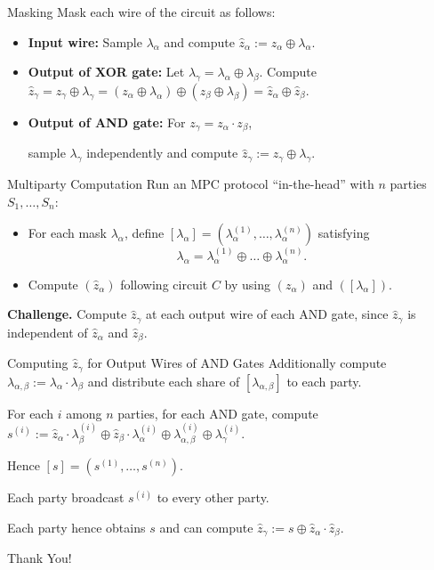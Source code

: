 \documentclass{beamer}
\begin{document}
	\begin{frame}{Masking}
		Mask each wire of the circuit as follows:
		\begin{itemize}
			\item \textbf{Input wire:} Sample $\lambda_\alpha$ and compute $\hat{z}_\alpha := z_\alpha \oplus \lambda_\alpha$.
			\item \textbf{Output of XOR gate:} Let $\lambda_\gamma = \lambda_\alpha \oplus \lambda_\beta$. Compute $\hat{z}_\gamma = z_\gamma \oplus \lambda_\gamma = (z_\alpha \oplus \lambda_\alpha) \oplus (z_\beta \oplus \lambda_\beta) =\hat{z}_\alpha \oplus \hat{z}_\beta$.
			\item \textbf{Output of AND gate:} For $z_\gamma = z_\alpha \cdot z_\beta$, 
			
			sample $\lambda_\gamma$ independently and compute $\hat{z}_\gamma := z_\gamma \oplus \lambda_\gamma$.
		\end{itemize}
	\end{frame}

	\begin{frame}{Multiparty Computation}
		Run an MPC protocol ``in-the-head'' with $n$ parties $S_1, \dots, S_n$:
		\begin{itemize}
			\item For each mask $\lambda_\alpha$, define $[\lambda_\alpha] = (\lambda_\alpha^{(1)}, \dots, \lambda_\alpha^{(n)})$ satisfying 
			\begin{equation*}
				\lambda_\alpha = \lambda_\alpha^{(1)} \oplus \dots\oplus \lambda_\alpha^{(n)}.
			\end{equation*}
			\item Compute $\left(\hat{z}_\alpha\right)$ following circuit $C$ by using $\left(z_\alpha\right)$ and $\left([\lambda_\alpha]\right)$.
		\end{itemize}
		\textbf{Challenge.} Compute $\hat{z}_\gamma$ at each output wire of each AND gate, since $\hat{z}_\gamma$ is independent of $\hat{z}_\alpha$ and $\hat{z}_\beta$.
	\end{frame}

	\begin{frame}{Computing $\hat{z}_\gamma$ for Output Wires of AND Gates}
		Additionally compute $\lambda_{\alpha,\beta} := \lambda_\alpha \cdot \lambda_\beta$ and distribute each share of $[\lambda_{\alpha,\beta}]$ to each party.
		
		For each $i$ among $n$ parties, for each AND gate, compute $s^{(i)} := \hat{z}_\alpha \cdot\lambda_\beta^{(i)}  \oplus \hat{z}_\beta\cdot\lambda_\alpha^{(i)}  \oplus \lambda_{\alpha,\beta}^{(i)}  \oplus \lambda_\gamma^{(i)} $.
		
		Hence $[s] = (s^{(1)}, \dots, s^{(n)})$. 
		
		Each party broadcast $s^{(i)}$ to every other party. 
		
		Each party hence obtains $s$ and can compute $\hat{z}_\gamma := s \oplus \hat{z}_\alpha \cdot \hat{z}_\beta$.
	\end{frame}
	
	\begin{frame}{}
		\begin{center}
			{\fontsize{20}{20}\selectfont Thank You!}
		\end{center}
	\end{frame}
	
\end{document}

